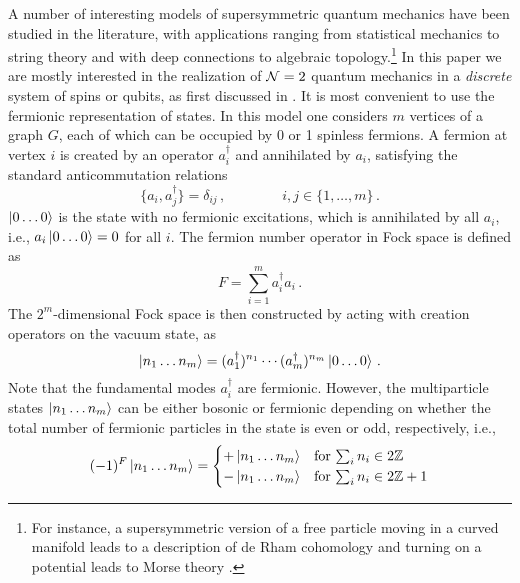 \documentclass[11pt]{article}
\numberwithin{equation}{section}
\def\cN{{\cal N}}
\newcommand\equ[1] {\begin{equation}#1\end{equation}}
\newcommand\eqs[1] {\begin{align}#1\end{align}}
\renewcommand\( {\left(}
\renewcommand\) {\right)}
\begin{document}
A number of interesting models of supersymmetric quantum mechanics have been studied in the literature, with applications ranging from statistical mechanics to string theory and with deep connections to algebraic topology.\footnote{For instance, a supersymmetric version of a free particle moving in a curved manifold leads to a description of de Rham cohomology and turning on a potential leads to Morse theory \cite{Witten:1982im}.}  In this paper we are mostly interested in the realization of $\cN=2$ quantum mechanics in a {\it discrete} system of spins or qubits, as first discussed in \cite{Nicolai:1976xp}. It is most convenient to use the fermionic representation of states. 
In this model one considers $m$ vertices of a graph $G$, each of which can be occupied by 0 or 1 spinless fermions. A fermion at vertex $i$ is created by an operator $a_{i}^{\dagger}$ and annihilated by $a_{i}$,  satisfying the standard  anticommutation relations
\equ{
\{a_i,a_j^\dagger\}= \delta_{ij}\,,\qquad \qquad i,j\in\{1,\ldots,m\}\,.
}
$\ket{0\dots0}$ is the state with no fermionic excitations, which is annihilated by all $a_i$, i.e.,  $a_{i}\ket{0\dots0}=0$ for all $i$. The fermion number operator in Fock space is defined as
\equ{
F=\sum_{i=1}^{m} a^{\dagger}_{i}a_{i}\,.
}
The $2^{m}$-dimensional Fock space is then constructed by acting  with creation operators on the vacuum state, as
\equ{\label{mapstates}
\ket{n_{1}\dots n_{m}}= (a_{1}^{\dagger})^{n_{1}}\cdots (a_{m}^{\dagger})^{n_{m}}\ket{0\dots0}\,.
}
Note that the fundamental modes $a_i^\dagger$ are fermionic. However, the multiparticle states $\ket{n_1\dots n_m}$ can be either bosonic or fermionic  depending on whether the total number of fermionic particles in the state is even or odd, respectively, i.e.,
\eqs{\label{paritystrings}
(-1)^{F}\ket{n_{1}\dots n_{m}}=\begin{cases} +\ket{n_{1}\dots n_{m}}&\text{for $\sum_{i} n_{i}\in 2\Bbb Z$}\\ -\ket{n_{1}\dots n_{m}} &\text{for $\sum_{i} n_{i}\in 2\Bbb Z+1$} \end{cases}
}
\end{document}

